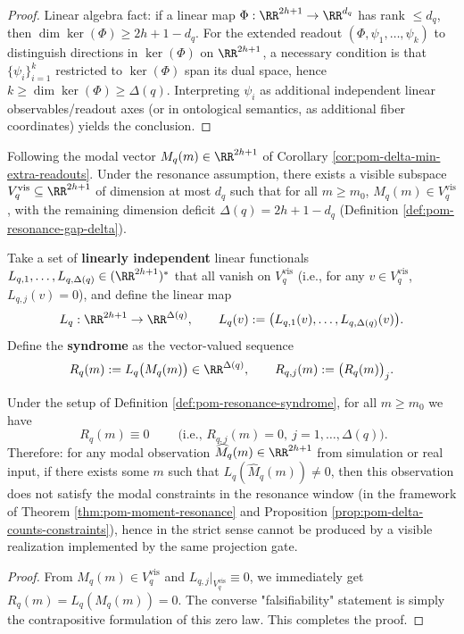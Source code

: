\begin{proof}
Linear algebra fact: if a linear map \(\Phi:\RR^{2h+1}\to\RR^{d_q}\) has rank \(\le d_q\), then \(\dim\ker(\Phi)\ge 2h+1-d_q\).
For the extended readout \((\Phi,\psi_1,\ldots,\psi_k)\) to distinguish directions in \(\ker(\Phi)\) on \(\RR^{2h+1}\), a necessary condition is that
\(\{\psi_i\}_{i=1}^k\) restricted to \(\ker(\Phi)\) span its dual space, hence \(k\ge \dim\ker(\Phi)\ge \Delta(q)\).
Interpreting \(\psi_i\) as additional independent linear observables/readout axes (or in ontological semantics, as additional fiber coordinates) yields the conclusion.
\end{proof}

\begin{definition}\label{def:pom-resonance-syndrome}
Following the modal vector
\(
M_q(m)\in\RR^{2h+1}
\)
of Corollary \ref{cor:pom-delta-min-extra-readouts}.
Under the resonance assumption, there exists a visible subspace \(V_q^{\mathrm{vis}}\subseteq\RR^{2h+1}\) of dimension at most \(d_q\) such that for all \(m\ge m_0\), \(M_q(m)\in V_q^{\mathrm{vis}}\), with the remaining dimension deficit \(\Delta(q)=2h+1-d_q\) (Definition \ref{def:pom-resonance-gap-delta}).
\par
Take a set of \textbf{linearly independent} linear functionals \(L_{q,1},\dots,L_{q,\Delta(q)}\in(\RR^{2h+1})^\ast\) that all vanish on \(V_q^{\mathrm{vis}}\) (i.e., for any \(v\in V_q^{\mathrm{vis}}\), \(L_{q,j}(v)=0\)), and define the linear map
\[
L_q:\RR^{2h+1}\to\RR^{\Delta(q)},\qquad
L_q(v):=\bigl(L_{q,1}(v),\dots,L_{q,\Delta(q)}(v)\bigr).
\]
Define the \textbf{syndrome} as the vector-valued sequence
\[
R_q(m):=L_q\bigl(M_q(m)\bigr)\in\RR^{\Delta(q)},
\qquad
R_{q,j}(m):=\bigl(R_q(m)\bigr)_j.
\]
\end{definition}

\begin{corollary}\label{cor:pom-resonance-syndrome-audit}
Under the setup of Definition \ref{def:pom-resonance-syndrome}, for all \(m\ge m_0\) we have
\[
\boxed{\;R_q(m)\equiv 0\;}
\qquad\text{(i.e., }R_{q,j}(m)=0,\ j=1,\dots,\Delta(q)\text{)}.
\]
Therefore: for any modal observation \(\widehat M_q(m)\in\RR^{2h+1}\) from simulation or real input, if there exists some \(m\) such that \(L_q(\widehat M_q(m))\neq 0\), then this observation does not satisfy the modal constraints in the resonance window (in the framework of Theorem \ref{thm:pom-moment-resonance} and Proposition \ref{prop:pom-delta-counts-constraints}), hence in the strict sense cannot be produced by a visible realization implemented by the same projection gate.
\end{corollary}
\begin{proof}
From \(M_q(m)\in V_q^{\mathrm{vis}}\) and \(L_{q,j}|_{V_q^{\mathrm{vis}}}\equiv 0\), we immediately get \(R_q(m)=L_q(M_q(m))=0\).
The converse "falsifiability" statement is simply the contrapositive formulation of this zero law. This completes the proof.
\end{proof}

